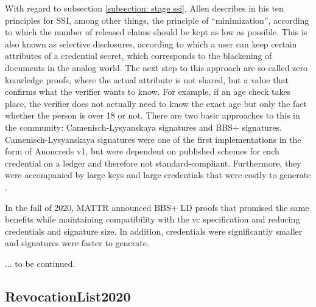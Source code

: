 		With regard to subsection \ref{subsection: stage ssi}, Allen describes in his ten principles for SSI, among other things, the principle of “minimization”, according to which the number of released claims should be kept as low as possible. This is also known as selective disclosures, according to which a user can keep certain attributes of a credential secret, which corresponds to the blackening of documents in the analog world. The next step to this approach are so-called zero knowledge proofs, where the actual attribute is not shared, but a value that confirms what the verifier wants to know. For example, if an age check takes place, the verifier does not actually need to know the exact age but only the fact whether the person is over 18 or not. There are two basic approaches to this in the community: Camenisch-Lysyanskaya signatures and BBS+ signatures. Camenisch-Lysyanskaya signatures were one of the first implementations in the form of Anoncreds v1, but were dependent on published schemes for each credential on a ledger and therefore not standard-compliant. Furthermore, they were accompanied by large keys and large credentials that were costly to generate \cite{zundel_why_2021}. \cite{young_verifiable_2021}
		
		In the fall of 2020, MATTR announced BBS+ LD proofs that promised the same benefits while maintaining compatibility with the \ac{vc} specification and reducing credentials and signature size. In addition, credentials were significantly smaller and signatures were faster to generate. \cite{zundel_why_2021}
		
		... to be continued.
		
		\subsection{RevocationList2020}\label{subsection: revocationlist2020}